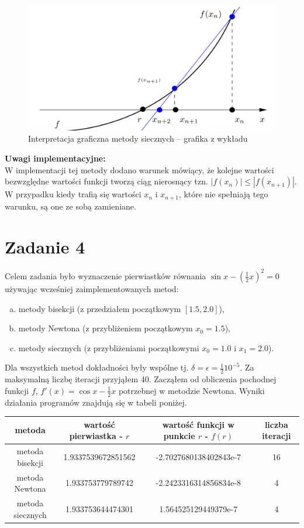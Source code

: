 \documentclass[]{article}
\begin{document}
	\begin{figure}[!htbp]
		\includegraphics[scale=0.59]{secant}
		\centering
		\caption{Interpretacja graficzna metody siecznych -- grafika z wykładu}
	\end{figure}
	\clearpage

	\noindent\textbf{Uwagi implementacyjne:}\\
	W implementacji tej metody dodano warunek mówiący, że kolejne wartości bezwzględne wartości funkcji tworzą ciąg nierosnący tzn. $|f(x_n)| \leq |f(x_{n+1})|$. W przypadku kiedy trafią się wartości $x_n$ i $x_{n+1}$, które nie spełniają tego warunku, są one ze sobą zamieniane.
	
	
	
	
	\section*{Zadanie 4}

	Celem zadania było wyznaczenie pierwiastków równania $\sin{x}-(\frac{1}{2}x)^2 = 0$ używając wcześniej zaimplementowanych metod:
	\begin{enumerate}[(a)]
		\item metody bisekcji (z przedziałem początkowym $[1.5, 2.0]$),
		\item metody Newtona (z przybliżeniem początkowym $x_0 = 1.5$),  
		\item metody siecznych (z przybliżeniami początkowymi $x_0 = 1.0$ i $x_1 = 2.0$).
	\end{enumerate}
	Dla wszystkich metod dokładności były wspólne tj. $\delta = \epsilon = \frac{1}{2}10^{-5}$. Za maksymalną liczbę iteracji przyjąłem 40. Zacząłem od obliczenia pochodnej funkcji $f$, $f'(x) = \cos{x} - \frac{1}{2}x$ potrzebnej w metodzie Newtona. Wyniki działania programów znajdują się w tabeli poniżej.
	
	\begin{table}[h!]
		\centering
		\label{tab:table1}
		\begin{tabular}{|c|c|c|c|}
			\hline
			metoda & wartość pierwiastka - $r$ & wartość funkcji w punkcie $r$ - $f(r)$ & liczba iteracji \\ \hline
			metoda bisekcji & 1.9337539672851562 & -2.7027680138402843e-7 & 16 \\ \hline
			metoda Newtona & 1.933753779789742 & -2.2423316314856834e-8 & 4 \\ \hline
			metoda siecznych & 1.933753644474301 & 1.564525129449379e-7 & 4 \\ \hline
		\end{tabular}
	\end{table}
	
\end{document}
